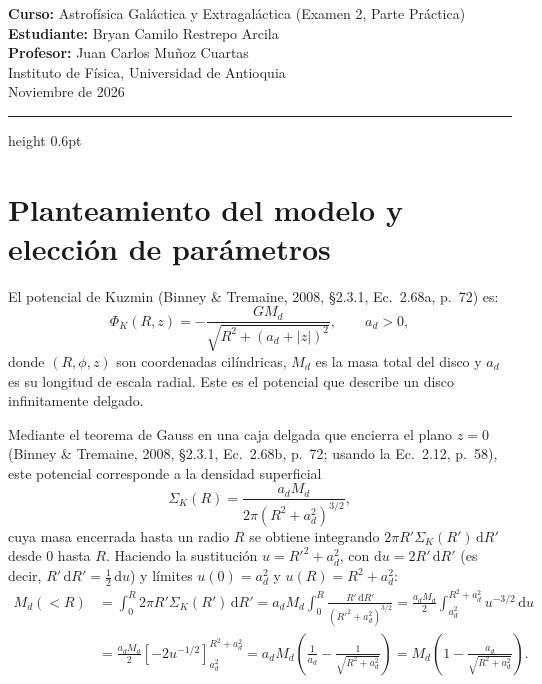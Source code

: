 \documentclass[11pt,letterpaper]{article}
\begin{document}

\vspace{6pt}
\noindent
\textbf{Curso:} Astrofísica Galáctica y Extragaláctica (Examen 2, Parte Práctica)\\
\textbf{Estudiante:} Bryan Camilo Restrepo Arcila\\
\textbf{Profesor:} Juan Carlos Muñoz Cuartas\\
Instituto de Física, Universidad de Antioquia\\
Noviembre de 2026

\vspace{4pt}
\hrule height 0.6pt
\vspace{8pt}

\section*{Planteamiento del modelo y elección de parámetros}

El potencial de Kuzmin (Binney \& Tremaine, 2008, \S 2.3.1, Ec.~2.68a, p.~72) es:
\begin{equation}
    \Phi_K(R, z) = -\frac{G M_d}{\sqrt{R^2 + (a_d + |z|)^2}}, \qquad a_d > 0,
    \label{eq:phi_kuzmin}
\end{equation}
donde $(R, \phi, z)$ son coordenadas cilíndricas, $M_d$ es la masa total del disco y $a_d$ es su longitud de escala radial. 
Este es el potencial que describe un disco infinitamente delgado.

Mediante el teorema de Gauss en una caja delgada que encierra el plano $z = 0$ (Binney \& Tremaine, 2008, \S 2.3.1, Ec.~2.68b, p.~72; usando la Ec.~2.12, p.~58), este potencial corresponde a la densidad superficial
\begin{equation}
    \Sigma_K(R) = \frac{a_d M_d}{2\pi (R^2 + a_d^2)^{3/2}},
    \label{eq:sigma_kuzmin}
\end{equation}
cuya masa encerrada hasta un radio $R$ se obtiene integrando $2\pi R'\Sigma_K(R')\,\mathrm{d}R'$ desde $0$ hasta $R$. Haciendo la sustitución $u = R'^2 + a_d^2$, con $\mathrm{d}u = 2R'\,\mathrm{d}R'$ (es decir, $R'\,\mathrm{d}R' = \tfrac{1}{2}\,\mathrm{d}u$) y límites $u(0) = a_d^2$ y $u(R) = R^2 + a_d^2$:
\begin{align}
    M_d(<R) &= \int_0^R 2\pi R'\Sigma_K(R')\,\mathrm{d}R'
    = a_d M_d \int_0^R \frac{R'\,\mathrm{d}R'}{(R'^2 + a_d^2)^{3/2}}
    = \frac{a_d M_d}{2} \int_{a_d^2}^{R^2 + a_d^2} u^{-3/2}\,\mathrm{d}u \nonumber \\
    &= \frac{a_d M_d}{2}\left[-2 u^{-1/2}\right]_{a_d^2}^{R^2 + a_d^2}
    = a_d M_d\left(\frac{1}{a_d} - \frac{1}{\sqrt{R^2 + a_d^2}}\right)
    = M_d\left(1 - \frac{a_d}{\sqrt{R^2 + a_d^2}}\right).
\end{align}
\end{document}
